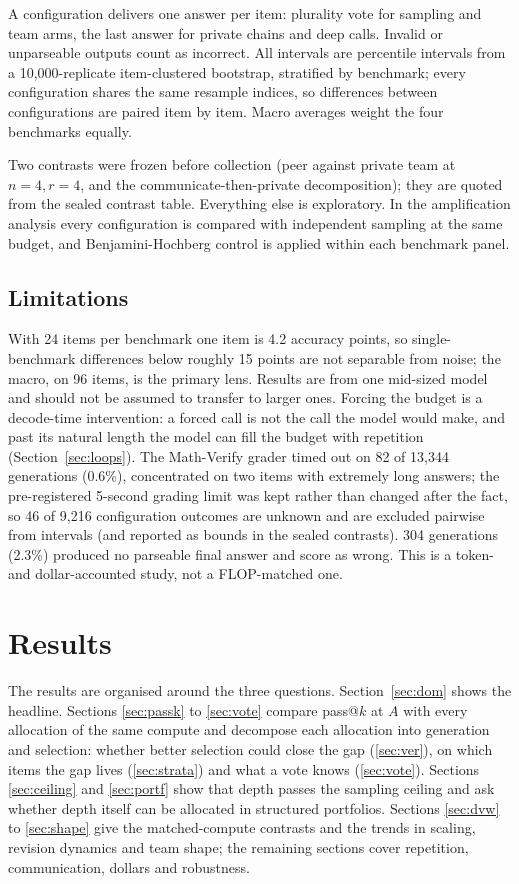 \documentclass[11pt]{article}
\begin{document}
A configuration delivers one answer per item: plurality vote for sampling and team arms, the last
answer for private chains and deep calls. Invalid or unparseable outputs count as incorrect. All
intervals are percentile intervals from a 10,000-replicate item-clustered bootstrap, stratified by
benchmark; every configuration shares the same resample indices, so differences between configurations
are paired item by item. Macro averages weight the four benchmarks equally.

Two contrasts were frozen before collection (peer against private team at $n=4, r=4$, and the
communicate-then-private decomposition); they are quoted from the sealed contrast table. Everything else
is exploratory. In the amplification analysis every configuration is compared with independent sampling
at the same budget, and Benjamini-Hochberg control is applied within each benchmark panel.

\subsection{Limitations}

With 24 items per benchmark one item is 4.2 accuracy points, so single-benchmark differences below
roughly 15 points are not separable from noise; the macro, on 96 items, is the primary lens. Results are
from one mid-sized model and should not be assumed to transfer to larger ones. Forcing the budget is a
decode-time intervention: a forced call is not the call the model would make, and past its natural
length the model can fill the budget with repetition (Section~\ref{sec:loops}). The Math-Verify grader
timed out on 82 of 13,344 generations (0.6\%),
concentrated on two items with extremely long answers; the pre-registered 5-second grading limit was kept
rather than changed after the fact, so 46 of 9,216
configuration outcomes are unknown and are excluded pairwise from intervals (and reported as bounds in
the sealed contrasts). 304 generations (2.3\%) produced no
parseable final answer and score as wrong. This is a token- and dollar-accounted study, not a FLOP-matched
one.

\section{Results}

The results are organised around the three questions. Section~\ref{sec:dom} shows the headline. Sections
\ref{sec:passk} to \ref{sec:vote} compare pass@$k$ at $A$ with every allocation of the same compute and
decompose each allocation into generation and selection: whether better selection could close the gap
(\ref{sec:ver}), on which items the gap lives (\ref{sec:strata}) and what a vote knows
(\ref{sec:vote}). Sections \ref{sec:ceiling} and \ref{sec:portf} show that depth passes the sampling ceiling
and ask whether depth itself can be allocated in structured portfolios. Sections \ref{sec:dvw} to
\ref{sec:shape} give the matched-compute contrasts and the trends in scaling, revision dynamics and team
shape; the remaining sections cover repetition, communication, dollars and robustness.
\end{document}
